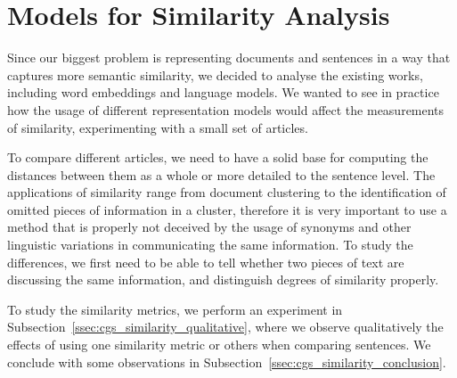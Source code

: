 \section{\statusgreen Models for Similarity Analysis}
\label{sec:cgs_similarity}
Since our biggest problem is representing documents and sentences in a way that captures more semantic similarity, we decided to analyse the existing works, including word embeddings and language models.
We wanted to see in practice how the usage of different representation models would affect the measurements of similarity, experimenting with a small set of articles. 

To compare different articles, we need to have a
solid base for computing the distances between them as a whole or more detailed to the sentence level.
The applications of similarity range from document clustering to the identification of omitted pieces of information in a cluster, therefore it is very important to use a method that is properly not deceived by the usage of synonyms and other linguistic variations in communicating the same information. To study the differences, we first need to be able to tell whether two pieces of text are discussing the same information, and distinguish degrees of similarity properly.

To study the similarity metrics, we perform an experiment in Subsection~\ref{ssec:cgs_similarity_qualitative}, where we observe qualitatively the effects of using one similarity metric or others when comparing sentences. 
We conclude with some observations in Subsection~\ref{ssec:cgs_similarity_conclusion}.


